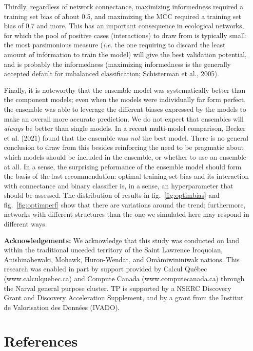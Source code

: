 \documentclass[11pt]{article}
\begin{document}
Thirdly, regardless of network connectance, maximizing informedness
required a training set bias of about 0.5, and maximizing the MCC
required a training set bias of 0.7 and more. This has an important
consequence in ecological networks, for which the pool of positive cases
(interactions) to draw from is typically small: the most parsimonious
measure (\emph{i.e.} the one requiring to discard the least amount of
information to train the model) will give the best validation potential,
and is probably the informedness (maximizing informedness is the
generally accepted default for imbalanced classification; Schisterman et
al., 2005).

Finally, it is noteworthy that the ensemble model was systematically
better than the component models; even when the models were individually
far form perfect, the ensemble was able to leverage the different biases
expressed by the models to make an overall more accurate prediction. We
do not expect that ensembles will \emph{always} be better than single
models. In a recent multi-model comparison, Becker et al. (2021) found
that the ensemble was \emph{not} the best model. There is no general
conclusion to draw from this besides reinforcing the need to be
pragmatic about which models should be included in the ensemble, or
whether to use an ensemble at all. In a sense, the surprising peformance
of the ensemble model should form the basis of the last recommendation:
optimal training set bias and its interaction with connectance and
binary classifier is, in a sense, an hyperparameter that should be
assessed. The distribution of results in fig.~\ref{fig:optimbias} and
fig.~\ref{fig:optimperf} show that there are variations around the
trend; furthermore, networks with different structures than the one we
simulated here may respond in different ways.

\textbf{Acknowledgements:} We acknowledge that this study was conducted
on land within the traditional unceded territory of the Saint Lawrence
Iroquoian, Anishinabewaki, Mohawk, Huron-Wendat, and Omàmiwininiwak
nations. This research was enabled in part by support provided by Calcul
Québec (www.calculquebec.ca) and Compute Canada (www.computecanada.ca)
through the Narval general purpose cluster. TP is supported by a NSERC
Discovery Grant and Discovery Acceleration Supplement, and by a grant
from the Institut de Valorisation des Données (IVADO).

\hypertarget{references}{%
\section*{References}\label{references}}
\end{document}
